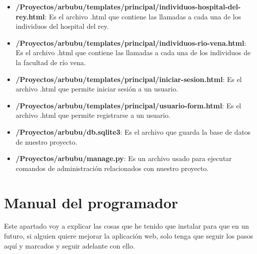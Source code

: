 \begin{itemize}
\begin{itemize}
\begin{itemize}
\begin{itemize}
				\item \textbf{/Proyectos/arbubu/templates/principal/individuos-hospital-del-rey.html}: Es el archivo .html que contiene las llamadas a cada una de los individuos del hospital del rey.
				\item \textbf{/Proyectos/arbubu/templates/principal/individuos-rio-vena.html}: Es el archivo .html que contiene las llamadas a cada una de los individuos de la facultad de río vena.
				\item \textbf{/Proyectos/arbubu/templates/principal/iniciar-sesion.html}: Es el archivo .html que permite iniciar sesión a un usuario.
				\item \textbf{/Proyectos/arbubu/templates/principal/usuario-form.html}: Es el archivo .html que permite registrarse a un usuario.
				\item \textbf{/Proyectos/arbubu/db.sqlite3}: Es el archivo que guarda la base de datos de nuestro proyecto.
				\item \textbf{/Proyectos/arbubu/manage.py}: Es un archivo usado para ejecutar comandos de administración relacionados con nuestro proyecto.
			\end{itemize}
		\end{itemize}
	\end{itemize}
\end{itemize}
\section{Manual del programador}

Este apartado voy a explicar las cosas que he tenido que instalar para que en un futuro, si alguien quiere mejorar la aplicación web, solo tenga que seguir los pasos aquí y marcados y seguir adelante con ello.


